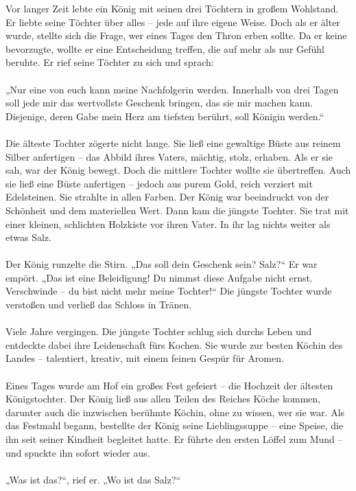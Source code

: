 Vor langer Zeit lebte ein König mit seinen drei Töchtern in großem Wohlstand. Er liebte seine Töchter über alles – jede auf ihre eigene Weise. Doch als er älter wurde, stellte sich die Frage, wer eines Tages den Thron erben sollte. Da er keine bevorzugte, wollte er eine Entscheidung treffen, die auf mehr als nur Gefühl beruhte.
Er rief seine Töchter zu sich und sprach:\\ \\
„Nur eine von euch kann meine Nachfolgerin werden. Innerhalb von drei Tagen soll jede mir das wertvollste Geschenk bringen, das sie mir machen kann. Diejenige, deren Gabe mein Herz am tiefsten berührt, soll Königin werden.“\\ \\
Die älteste Tochter zögerte nicht lange. Sie ließ eine gewaltige Büste aus reinem Silber anfertigen – das Abbild ihres Vaters, mächtig, stolz, erhaben. Als er sie sah, war der König bewegt.
Doch die mittlere Tochter wollte sie übertreffen. Auch sie ließ eine Büste anfertigen – jedoch aus purem Gold, reich verziert mit Edelsteinen. Sie strahlte in allen Farben. Der König war beeindruckt von der Schönheit und dem materiellen Wert.
Dann kam die jüngste Tochter. Sie trat mit einer kleinen, schlichten Holzkiste vor ihren Vater. In ihr lag nichts weiter als etwas Salz.\\ \\
Der König runzelte die Stirn.
„Das soll dein Geschenk sein? Salz?“
Er war empört.
„Das ist eine Beleidigung! Du nimmst diese Aufgabe nicht ernst. Verschwinde – du bist nicht mehr meine Tochter!“
Die jüngste Tochter wurde verstoßen und verließ das Schloss in Tränen.\\ \\
Viele Jahre vergingen. Die jüngste Tochter schlug sich durchs Leben und entdeckte dabei ihre Leidenschaft fürs Kochen. Sie wurde zur besten Köchin des Landes – talentiert, kreativ, mit einem feinen Gespür für Aromen.\\ \\
Eines Tages wurde am Hof ein großes Fest gefeiert – die Hochzeit der ältesten Königstochter. Der König ließ aus allen Teilen des Reiches Köche kommen, darunter auch die inzwischen berühmte Köchin, ohne zu wissen, wer sie war.
Als das Festmahl begann, bestellte der König seine Lieblingssuppe – eine Speise, die ihn seit seiner Kindheit begleitet hatte. Er führte den ersten Löffel zum Mund – und spuckte ihn sofort wieder aus.\\ \\
„Was ist das?“, rief er. „Wo ist das Salz?“
